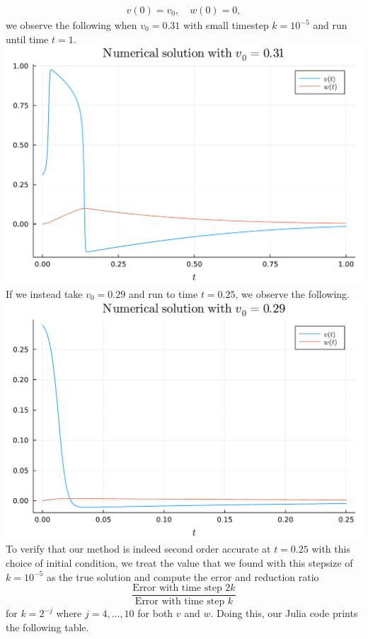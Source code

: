 \documentclass{article}
\begin{document}
\begin{align*}
v(0) = v_0, \quad w(0) = 0,
\end{align*}
we observe the following when $v_0=0.31$ with small timestep $k=10^{-5}$ and run until time $t=1$. \\
\includegraphics[scale=0.5]{prob2a.pdf}\\
If we instead take $v_0=0.29$ and run to time $t=0.25$, we observe the following.\\
\includegraphics[scale=0.5]{prob2b.pdf}\\
To verify that our method is indeed second order accurate at $t=0.25$ with this choice of initial condition, we treat the value that we found with this stepsize of $k=10^{-5}$ as the true solution and compute the error and reduction ratio $$\frac{\text{Error with time step } 2k}{\text{Error with time step } k}$$ for $k=2^{-j}$ where $j=4,\ldots,10$ for both $v$ and $w$. Doing this, our Julia code prints the following table. 
\end{document}
